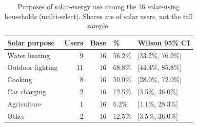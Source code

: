 \begin{table}
\caption{Purposes of solar-energy use among the 16 solar-using households (multi-select). Shares are of solar users, not the full sample.}
\label{tab:solar_purposes}
\begin{tabular}{lrrll}
\toprule
Solar purpose & Users & Base & \% & Wilson 95\% CI \\
\midrule
Water heating & 9 & 16 & 56.2\% & [33.2\%, 76.9\%] \\
Outdoor lighting & 11 & 16 & 68.8\% & [44.4\%, 85.8\%] \\
Cooking & 8 & 16 & 50.0\% & [28.0\%, 72.0\%] \\
Car charging & 2 & 16 & 12.5\% & [3.5\%, 36.0\%] \\
Agriculture & 1 & 16 & 6.2\% & [1.1\%, 28.3\%] \\
Other & 2 & 16 & 12.5\% & [3.5\%, 36.0\%] \\
\bottomrule
\end{tabular}
\end{table}
